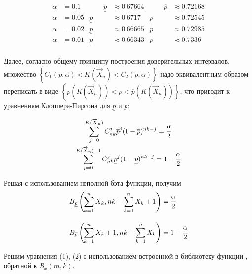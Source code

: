 \documentclass[a4paper, 14pt]{extarticle}
\begin{document}
\vspace{-10pt}

\begin{alignat*}{3}
    \alpha & = 0.1  & \qquad \underline{p} & \approx 0.67664 & \qquad \overline{p} & \approx 0.72168  \\
    \alpha & = 0.05 &       \underline{p} & \approx 0.6717 &       \overline{p} & \approx 0.72545  \\
    \alpha & = 0.02 &       \underline{p} & \approx 0.66665 &       \overline{p} & \approx 0.72985  \\
    \alpha & = 0.01 &       \underline{p} & \approx 0.66343 &       \overline{p} & \approx 0.7336  \\
\end{alignat*}

\begin{spacing}{1.75}
\fontsize{12pt}{16pt}\selectfont
Далее, согласно общему принципу построения доверительных интервалов, множество 
$ \left\{ C_1(p, \alpha) < K(\overrightarrow{X}_n) < C_2(p, \alpha) \right\} $
надо эквивалентным образом переписать в виде 
$ \left\{ \underline{p} (K(\overrightarrow{X}_n)) < p < \overline{p} (K(\overrightarrow{X}_n)) \right\}$, 
что приводит к уравнениям Клоппера-Пирсона для $\underline{p}$ и $\overline{p}$:
\end{spacing}

\vspace{-20pt}

\begin{gather*}
    \sum_{j=0}^{K(\overrightarrow{X}_n)} C_{nk}^j \overline{p}^j (1 - \overline{p})^{nk - j} = \cfrac{\alpha}{2} \\
    \sum_{j=0}^{K(\overrightarrow{X}_n) - 1} C_{nk}^j \underline{p}^j (1 - \underline{p})^{nk - j} = 1 - \cfrac{\alpha}{2}
\end{gather*}

Решая с использованием неполной бэта-функции, получим
\begin{align}
    & B_{\underline{p}} \left( \sum_{k=1}^{n} X_k, nk - \sum_{k=1}^{n} X_k + 1 \right) = \cfrac{\alpha}{2} \\[1em]
    & B_{\overline{p}} \left( \sum_{k=1}^{n} X_k + 1, nk - \sum_{k=1}^{n} X_k \right)  = 1 - \cfrac{\alpha}{2} 
\end{align}

Решим уравнения (1), (2) с использованием встроенной в библиотеку  функции , 
обратной к $B_x (m, k)$. 

\newpage
\end{document}
